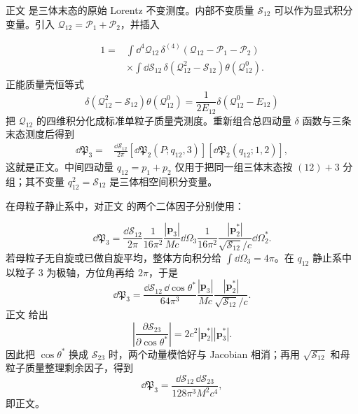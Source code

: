 \begin{derivation}
正文 是三体末态的原始 Lorentz 不变测度。内部不变质量 $\mathcal S_{12}$ 可以作为显式积分变量。引入 $\mathcal Q_{12}=\mathcal P_1+\mathcal P_2$，并插入

\begin{align*}
1
={}&\int\dd^4 \mathcal Q_{12}\,
\delta^{(4)}(\mathcal Q_{12}-\mathcal P_1-\mathcal P_2)\\
&\times\int\dd\mathcal S_{12}\,
\delta(\mathcal Q_{12}^2-\mathcal S_{12})\theta(\mathcal Q_{12}^0).
\end{align*}
正能质量壳恒等式
\begin{equation*}
\delta(\mathcal Q_{12}^2-\mathcal S_{12})\theta(\mathcal Q_{12}^0)
=\frac{1}{2E_{12}}\delta(\mathcal Q_{12}^0-E_{12})
\end{equation*}
把 $\mathcal Q_{12}$ 的四维积分化成标准单粒子质量壳测度。重新组合总四动量 $\delta$ 函数与三条末态测度后得到
\begin{align*}
\dd\mathfrak P_3
={}&\frac{\dd\mathcal S_{12}}{2\pi}
\left[\dd\mathfrak P_2(P;q_{12},3)\right]
\left[\dd\mathfrak P_2(q_{12};1,2)\right],
\end{align*}
这就是正文。中间四动量 $q_{12}=p_1+p_2$ 仅用于把同一组三体末态按 $(12)+3$ 分组；其不变量 $q_{12}^2=\mathcal S_{12}$ 是三体相空间积分变量。
\end{derivation}

\begin{derivation}
在母粒子静止系中，对正文 的两个二体因子分别使用：

\begin{equation*}
\dd\mathfrak P_3
=\frac{\dd\mathcal S_{12}}{2\pi}
\frac{1}{16\pi^2}\frac{|\mathbf p_3|}{Mc}\dd\Omega_3
\frac{1}{16\pi^2}\frac{|\mathbf p_2^*|}{\sqrt{\mathcal S_{12}}/c}\dd\Omega_2^*.
\end{equation*}
若母粒子无自旋或已做自旋平均，整体方向积分给 $\int\dd\Omega_3=4\pi$。在 $q_{12}$ 静止系中以粒子 3 为极轴，方位角再给 $2\pi$，于是
\begin{equation*}
\dd\mathfrak P_3
=\frac{\dd\mathcal S_{12}\,\dd\cos\theta^*}{64\pi^3}
\frac{|\mathbf p_3|}{Mc}
\frac{|\mathbf p_2^*|}{\sqrt{\mathcal S_{12}}/c}.
\end{equation*}
正文 给出
\begin{equation*}
\left|\frac{\partial\mathcal S_{23}}{\partial\cos\theta^*}\right|
=2c^2|\mathbf p_2^*||\mathbf p_3^*|.
\end{equation*}
因此把 $\cos\theta^*$ 换成 $\mathcal S_{23}$ 时，两个动量模恰好与 Jacobian 相消；再用 $\sqrt{\mathcal S_{12}}$ 和母粒子质量整理剩余因子，得到
\begin{equation*}
\dd\mathfrak P_3
=\frac{\dd\mathcal S_{12}\,\dd\mathcal S_{23}}{128\pi^3M^2c^4},
\end{equation*}
即正文。
\end{derivation}

